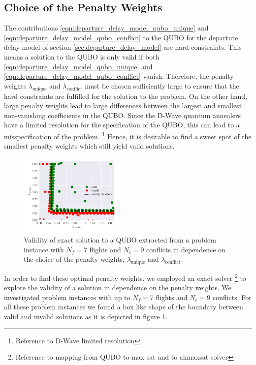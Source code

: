 \subsection{Choice of the Penalty Weights}
The contributions \eqref{eqn:departure_delay_model_qubo_unique} and \eqref{eqn:departure_delay_model_qubo_conflict} to the QUBO for the departure delay model of section \ref{sec:departure_delay_model} are hard constraints.
This means a solution to the QUBO is only valid if both \eqref{eqn:departure_delay_model_qubo_unique} and \eqref{eqn:departure_delay_model_qubo_conflict} vanish.
Therefore, the penalty weights $\lambda_\text{unique}$ and $\lambda_\text{conflict}$ must be chosen sufficiently large to ensure that the hard constraints are fulfilled for the solution to the problem.
On the other hand, large penalty weights lead to large differences between the largest and smallest non-vanishing coefficients in the QUBO.
Since the D-Wave quantum annealers have a limited resolution for the specification of the QUBO, this can lead to a misspecification of the problem. \footnote{Reference to D-Wave limited resolution}
Hence, it is desirable to find a sweet spot of the smallest penalty weights which still yield valid solutions.

\begin{figure}[htpb]
    \centering
    \includegraphics[width=0.45\textwidth,natwidth=1,natheight=0]{./pics/validity_boundary_example.pdf}
    \caption{Validity of exact solution to a QUBO extracted from a problem instance with $N_f=7$ flights and $N_c=9$ conflicts in dependence on the choice of the penalty weights, $\lambda_\text{unique}$ and $\lambda_\text{conflict}$.}
    \label{fig:penalty_weights}
\end{figure}

In order to find these optimal penalty weights, we employed an exact solver \footnote{Reference to mapping from QUBO to max sat and to akmaxsat solver} to explore the validity of a solution in dependence on the penalty weights.
We investigated problem instances with up to $N_f=7$ flights and $N_c=9$ conflicts.
For all these problem instances we found a box like shape of the boundary between valid and invalid solutions as it is depicted in figure \ref{fig:penalty_weights}.

